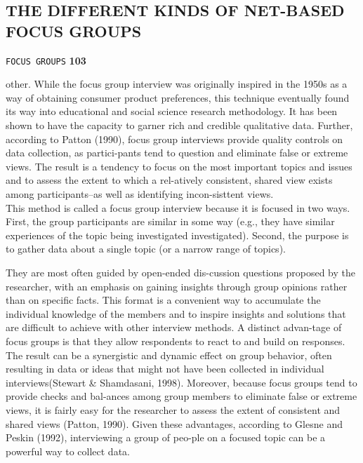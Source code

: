 \documentclass[a4,9pt]{beamer}
\begin{document}
\begin{frame}
\section*{THE DIFFERENT KINDS OF NET-BASED FOCUS GROUPS }
\begin{flushright}
 \texttt{FOCUS GROUPS} \hspace*{1cm} \textbf{103}
\end{flushright}

\vspace*{0.5cm}
other. While the focus group interview was originally inspired in the 1950s as a way of obtaining consumer product preferences, this technique eventually found its way into educational and social science research methodology. It has been shown to have the capacity to garner rich and credible qualitative data. Further, according to Patton (1990), focus group interviews provide quality controls on data collection, as partici-pants tend to question and eliminate false or extreme views. The result is a tendency to focus on the most important topics and issues and to assess the extent to which a rel-atively consistent, shared view exists among participants--as well as identifying incon-sisttent views.\\
\hspace*{0.5cm} This method is called a focus group interview because it is focused in two ways.
First, the group participants are similar in some way (e.g., they have similar experiences of the topic being investigated investigated). Second, the purpose is to gather data about a single topic (or a narrow range of topics).
\end{frame}

\begin{frame}
They are most often guided by open-ended dis-cussion questions proposed by  the researcher, with an emphasis on gaining insights through group opinions rather than on specific facts. This format is a convenient way to accumulate the individual knowledge of the members and to inspire insights and solutions that are difficult to achieve with other interview methods. A distinct advan-tage of focus groups is that they allow respondents to react to and build on responses. The result can be a synergistic and dynamic effect on group behavior, often resulting in data or ideas that might not have been collected in individual interviews(Stewart \& Shamdasani, 1998). Moreover, because focus groups tend to provide checks and bal-ances among group members to eliminate false or extreme views, it is fairly easy for the researcher to assess the extent of consistent and shared views (Patton, 1990). Given these advantages, according to Glesne and Peskin (1992), interviewing a group of peo-ple on a focused topic can be a powerful way to collect data.
\end{frame}
\end{document}
